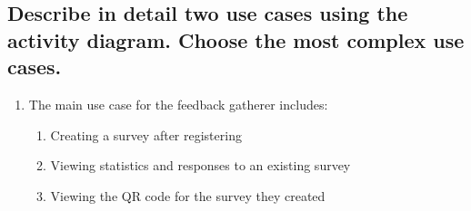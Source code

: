 \documentclass[letterpaper, 12 pt, conference]{ieeeconf}
\begin{document}
\newpage
\subsection{Describe in detail two use cases using the activity diagram. Choose the most complex use cases.}
\begin{enumerate}
    \item The main use case for the feedback gatherer includes: 
    \begin{enumerate}
        \item Creating a survey after registering
        \item Viewing statistics and responses to an existing survey
        \item Viewing the QR code for the survey they created
    \end{enumerate}
    \hfill \break


\end{enumerate}
\end{document}
